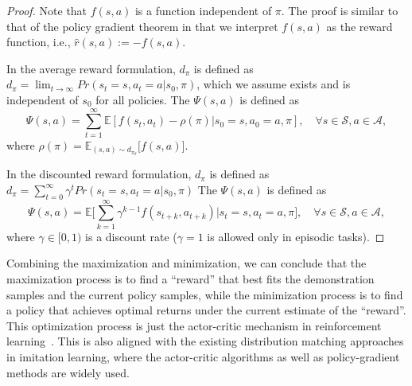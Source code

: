 \begin{proof}
Note that $f(s, a)$ is a function independent of $\pi$. 
The proof is similar to that of the policy gradient theorem in that we interpret $f(s, a)$ as the reward function, i.e., $\hat{r}(s, a) := -f(s, a)$. 

In the average reward formulation, $d_\pi$ is defined as $d_{\pi}=\lim_{t\rightarrow\infty}Pr(s_t=s, a_t=a|s_0, \pi)$, which we assume exists and is independent of $s_0$ for all policies. 
The $\Psi(s, a)$ is defined as 
\begin{equation*}
\Psi(s, a) = \sum_{t=1}^{\infty} \mathbb{E}[f(s_t, a_t) - \rho(\pi) | s_0 = s, a_0 =a, \pi], \quad \forall s\in\mathcal{S}, a\in\mathcal{A}, 
\end{equation*}
where $\rho(\pi) = \mathbb{E}_{(s, a)\sim d_{\pi_{\theta}}}\big[ f(s, a) \big] $. 


In the discounted reward formulation, $d_\pi$ is defined as $d_{\pi}=\sum_{t=0}^{\infty}\gamma^t Pr(s_t=s, a_t=a|s_0, \pi)$
The $\Psi(s, a)$ is defined as 
\begin{equation*}
\Psi(s, a) = \mathbb{E}\big[ \sum_{k=1}^{\infty} \gamma^{k-1} f(s_{t+k}, a_{t+k}) | s_t = s, a_t =a, \pi \big], \quad \forall s\in\mathcal{S}, a\in\mathcal{A}, 
\end{equation*}
where $\gamma\in[0, 1)$ is a discount rate ($\gamma=1$ is allowed only in episodic tasks).
\end{proof}

Combining the maximization and minimization, 
we can conclude that the maximization process is to find a ``reward'' that best fits the demonstration samples and the current policy samples, 
while the minimization process is to find a policy that achieves optimal returns under the current estimate of the ``reward''. 
This optimization process is just the actor-critic mechanism in reinforcement learning~\citep{konda2000actor}. 
This is also aligned with the existing distribution matching approaches in imitation learning, where the actor-critic algorithms as well as policy-gradient methods are widely used. 

